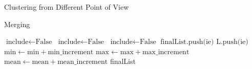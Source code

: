 \begin{subsection}{Clustering from Different Point of View}
\begin{subsubsection}{Merging}
\begin{algorithm}
\begin{algorithmic}[1]
\State $\text{include} \gets \text{False}$
\Break
\EndIf
{} 
\State $\text{include} \gets \text{False}$
\Break
\EndIf
{} 
\State $\text{include} \gets \text{False}$
\Break
\EndIf
{} 
\State $\text{finalList.push(ie)}$
\Else
\State $\text{L.push(ie)}$
\EndIf
\State $\text{min} \gets \text{min} + \text{min\_increment}$
\State $\text{max} \gets \text{max} + \text{max\_increment}$
\State $\text{mean} \gets \text{mean} + \text{mean\_increment}$
\EndWhile
\Return finalList
\EndProcedure
\end{algorithmic}
\end{algorithm}

\end{subsubsection}

\end{subsection}




